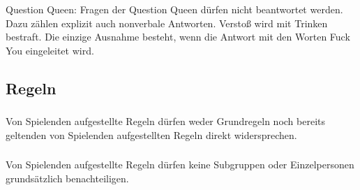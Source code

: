 \subsubsection{}
Question Queen: Fragen der Question Queen dürfen nicht beantwortet werden.
Dazu zählen explizit auch nonverbale Antworten. Verstoß wird mit Trinken bestraft.
Die einzige Ausnahme besteht, wenn die Antwort mit den Worten \glqq{}Fuck You\grqq{} eingeleitet wird.

\subsection{Regeln}
\subsubsection{}
Von Spielenden aufgestellte Regeln dürfen weder Grundregeln noch bereits geltenden von Spielenden aufgestellten Regeln direkt widersprechen.

\subsubsection{}
Von Spielenden aufgestellte Regeln dürfen keine Subgruppen oder Einzelpersonen grundsätzlich benachteiligen.
